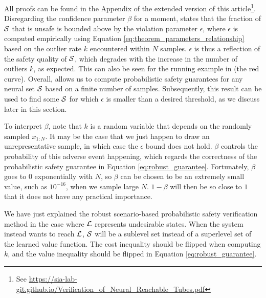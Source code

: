 % 
All proofs can be found in the Appendix of the extended version of this article\footnote{\label{note:extended_paper}See \url{https://sia-lab-git.github.io/Verification_of_Neural_Reachable_Tubes.pdf}}.
Disregarding the confidence parameter $\beta$ for a moment,  states that the fraction of $\mathcal{S}$ that is unsafe is bounded above by the violation parameter $\epsilon$, where $\epsilon$ is computed empirically using Equation \eqref{eq:theorem_parameters_relationship} based on the outlier rate $k$ encountered within $N$ samples.
$\epsilon$ is thus a reflection of the safety quality of $\mathcal{S}$, which degrades with the increase in the number of outliers $k$, as expected. This can also be seen for the running example in  (the red curve).
Overall,  allows us to compute probabilistic safety guarantees for any neural set $\mathcal{S}$ based on a finite number of samples.
Subsequently, this result can be used to find some $\mathcal{S}$ for which $\epsilon$ is smaller than a desired threshold, as we discuss later in this section.

To interpret $\beta$, note that $k$ is a random variable that depends on the randomly sampled $x_{1:N}$. It may be the case that we just happen to draw an unrepresentative sample, in which case the $\epsilon$ bound does not hold. $\beta$ controls the probability of this adverse event happening, which regards the correctness of the probabilistic safety guarantee in Equation \eqref{eq:robust_guarantee}. Fortunately, $\beta$ goes to $0$ exponentially with $N$, so $\beta$ can be chosen to be an extremely small value, such as $10^{-16}$, when we sample large $N$. $1-\beta$ will then be so close to $1$ that it does not have any practical importance.

We have just explained the robust scenario-based probabilistic safety verification method in the case where $\mathcal{L}$ represents undesirable states. When the system instead wants to reach $\mathcal{L}$, $\mathcal{S}$ will be a sublevel set instead of a superlevel set of the learned value function.
The cost inequality should be flipped when computing $k$, and the value inequality should be flipped in Equation \eqref{eq:robust_guarantee}. 

